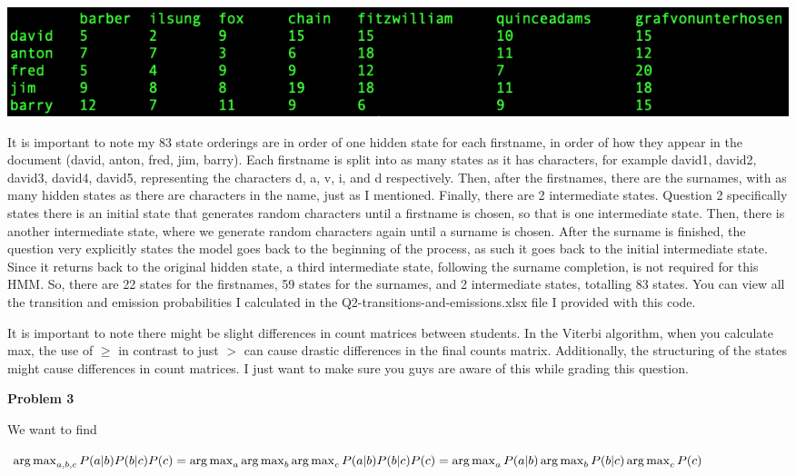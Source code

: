 \documentclass[12pt]{article}
\DeclareMathOperator*{\argmax}{arg\,max}
\begin{document}
\includegraphics[scale=0.75]{q2-matrix}

It is important to note my 83 state orderings are in order of one hidden state for each firstname, in order of how they appear in the document (david, anton, fred, jim, barry). Each firstname is split into as many states as it has characters, for example david1, david2, david3, david4, david5, representing the characters d, a, v, i, and d respectively. Then, after the firstnames, there are the surnames, with as many hidden states as there are characters in the name, just as I mentioned. Finally, there are 2 intermediate states. Question 2 specifically states there is an initial state that generates random characters until a firstname is chosen, so that is one intermediate state. Then, there is another intermediate state, where we generate random characters again until a surname is chosen. After the surname is finished, the question very explicitly states the model goes back to the beginning of the process, as such it goes back to the initial intermediate state. Since it returns back to the original hidden state, a third intermediate state, following the surname completion, is not required for this HMM. So, there are 22 states for the firstnames, 59 states for the surnames, and 2 intermediate states, totalling 83 states. You can view all the transition and emission probabilities I calculated in the Q2-transitions-and-emissions.xlsx file I provided with this code.

It is important to note there might be slight differences in count matrices between students. In the Viterbi algorithm, when you calculate max, the use of $\geq$ in contrast to just $>$ can cause drastic differences in the final counts matrix. Additionally, the structuring of the states might cause differences in count matrices. I just want to make sure you guys are aware of this while grading this question.

\pagebreak\textbf{Problem 3}

We want to find 

$\argmax_{a, b, c} P(a\vert b)P(b\vert c)P(c) \\
= \argmax_{a}\argmax_{b}\argmax_{c} P(a\vert b)P(b\vert c)P(c) \\
= \argmax_{a}P(a\vert b)\argmax_{b}P(b\vert c)\argmax_{c} P(c)$
\end{document}

